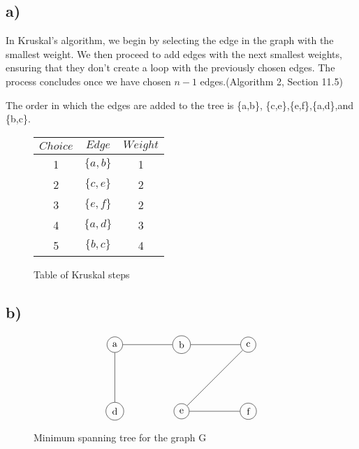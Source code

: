 \documentclass[12pt]{article}
\begin{document}
\subsection*{a)}

In Kruskal's algorithm, we begin by selecting the edge in the graph with the smallest weight. We then proceed to add edges with the next smallest weights, ensuring that they don't create a loop with the previously chosen edges. The process concludes once we have chosen \( n - 1 \) edges.(Algorithm 2, Section 11.5)

The order in which the edges are added to the tree is \{a,b\}, \{c,e\},\{e,f\},\{a,d\},and \{b,c\}.

\begin{figure}[H] 

\begin{table}[H]
	\small
	\centering
	\begin{tabular}{|c|c|c|}	
	\hline
	$Choice$ & $Edge$ & $Weight$\\
	\hline 
	1 & $\{a,b\}$ & 1\\			
	2 & $\{c,e\}$ & 2\\	
	3 & $\{e,f\}$ & 2\\	
	4 & $\{a,d\}$ & 3\\	
	5 & $\{b,c\}$ & 4 \\	
	\hline 
	\end{tabular}
\end{table}

\caption{Table of Kruskal steps}
\end{figure}

\subsection*{b)}

\begin{figure}[H] 
    \[
\begin{tikzpicture}[scale=0.8]
    \node[circle,draw,] (a) at (-3,0) {a};
    \node[circle,draw,] (b) at (0,0) {b};
    \node[circle,draw,] (c) at (3,0) {c};
    \node[circle,draw,] (d) at (-3,-3) {d};
    \node[circle,draw,](e) at (0,-3) {e};
    \node[circle,draw,] (f) at (3,-3) {f};
    
    \draw (a) -- (b);
    \draw (c) -- (e);
    \draw (e) -- (f);
    \draw (a) -- (d);
    \draw (b) -- (c);
    
\end{tikzpicture}
\]
\caption{Minimum spanning tree for the graph G}
\end{figure}
\end{document}
